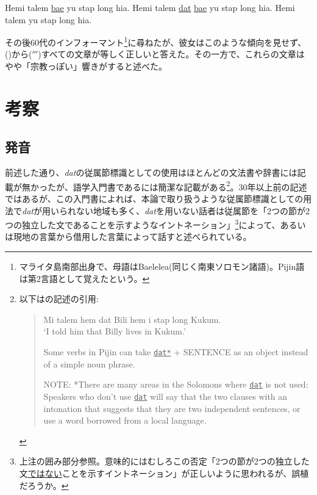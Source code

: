 \begin{exe}
 Hemi talem \underline{bae} yu stap long hia.
 Hemi talem \underline{dat} \underline{bae} yu stap long hia.
 Hemi talem yu stap long hia.
\end{exe}

その後60代のインフォーマント\footnote{
\label{fn:baelelea}マライタ島南部出身で、母語はBaelelea(同じく南東ソロモン諸語)。Pijin語は第2言語として覚えたという。}に尋ねたが、彼女はこのような傾向を見せず、()から($'''$)すべての文章が等しく正しいと答えた。その一方で、これらの文章はやや「宗教っぽい」響きがすると述べた。

\section{考察}
\subsection{発音}
前述した通り、\textit{dat}の従属節標識としての使用はほとんどの文法書や辞書には記載が無かったが、語学入門書である\cite{eric}には簡潔な記載がある\footnote{
以下は\cite{eric}の記述の引用:\vspace{0.1in}
\hspace{0.4in}\begin{quote}
\begin{exe}
   Mi talem hem dat Bili hem i stap long Kukum. \\
  `I told him that Billy lives in Kukum.'
\end{exe}\vspace{0.1in}
Some verbs in Pijin can take \underline{\texttt{dat*}} + SENTENCE as an object instead of a simple noun phrase.
\begin{screen}
NOTE: *There are many areas in the Solomons where \underline{\texttt{dat}} is not used: Speakers who don't use \underline{\texttt{dat}} will say that the two clauses with an intonation that suggests that they are two independent sentences, or use a word borrowed from a local language.
\end{screen}
\end{quote}
}。30年以上前の記述ではあるが、この入門書によれば、本論で取り扱うような従属節標識としての用法で\textit{dat}が用いられない地域も多く、\textit{dat}を用いない話者は従属節を「2つの節が2つの独立した文であることを示すようなイントネーション」\footnote{
上注の囲み部分参照。意味的にはむしろこの否定「2つの節が2つの独立した文\underline{ではない}ことを示すイントネーション」が正しいように思われるが、誤植だろうか。}によって、あるいは現地の言葉から借用した言葉によって話すと述べられている。

